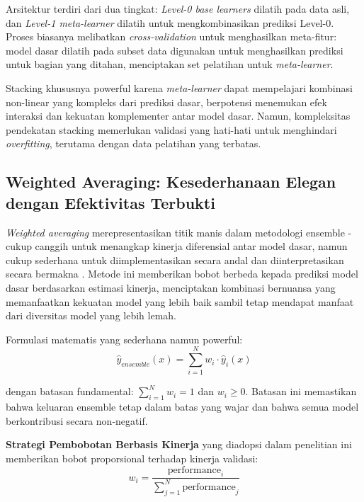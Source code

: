 Arsitektur terdiri dari dua tingkat: \textit{Level-0 base learners} dilatih pada data asli, dan \textit{Level-1 meta-learner} dilatih untuk mengkombinasikan prediksi Level-0. Proses biasanya melibatkan \textit{cross-validation} untuk menghasilkan meta-fitur: model dasar dilatih pada subset data digunakan untuk menghasilkan prediksi untuk bagian yang ditahan, menciptakan set pelatihan untuk \textit{meta-learner}.

Stacking khususnya powerful karena \textit{meta-learner} dapat mempelajari kombinasi non-linear yang kompleks dari prediksi dasar, berpotensi menemukan efek interaksi dan kekuatan komplementer antar model dasar. Namun, kompleksitas pendekatan stacking memerlukan validasi yang hati-hati untuk menghindari \textit{overfitting}, terutama dengan data pelatihan yang terbatas.

\subsection{Weighted Averaging: Kesederhanaan Elegan dengan Efektivitas Terbukti}

\textit{Weighted averaging} merepresentasikan titik manis dalam metodologi ensemble - cukup canggih untuk menangkap kinerja diferensial antar model dasar, namun cukup sederhana untuk diimplementasikan secara andal dan diinterpretasikan secara bermakna \cite{kuncheva2004combining}. Metode ini memberikan bobot berbeda kepada prediksi model dasar berdasarkan estimasi kinerja, menciptakan kombinasi bernuansa yang memanfaatkan kekuatan model yang lebih baik sambil tetap mendapat manfaat dari diversitas model yang lebih lemah.

Formulasi matematis yang sederhana namun powerful:
\begin{equation}
\hat{y}_{ensemble}(x) = \sum_{i=1}^{N} w_i \cdot \hat{y}_i(x)
\label{eq:weighted_ensemble}
\end{equation}

dengan batasan fundamental: $\sum_{i=1}^{N} w_i = 1$ dan $w_i \geq 0$. Batasan ini memastikan bahwa keluaran ensemble tetap dalam batas yang wajar dan bahwa semua model berkontribusi secara non-negatif.

\textbf{Strategi Pembobotan Berbasis Kinerja} yang diadopsi dalam penelitian ini memberikan bobot proporsional terhadap kinerja validasi:
\begin{equation}
w_i = \frac{\text{performance}_i}{\sum_{j=1}^{N} \text{performance}_j}
\label{eq:performance_weight}
\end{equation}

